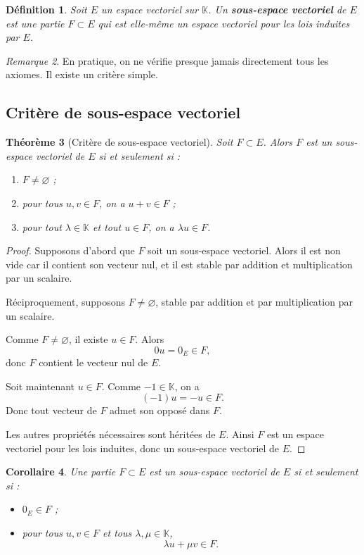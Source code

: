 \documentclass[11pt,a4paper]{article}
\newtheorem{definition}{Définition}[section]
\newtheorem{theoreme}[definition]{Théorème}
\newtheorem{corollaire}[definition]{Corollaire}
\theoremstyle{remark}
\newtheorem{remarque}[definition]{Remarque}
\newcommand{\K}{\mathbb{K}}
\begin{document}
\begin{definition}
Soit \(E\) un espace vectoriel sur \(\K\).  
Un \textbf{sous-espace vectoriel} de \(E\) est une partie \(F\subset E\) qui est elle-même un espace vectoriel pour les lois induites par \(E\).
\end{definition}

\begin{remarque}
En pratique, on ne vérifie presque jamais directement tous les axiomes. Il existe un critère simple.
\end{remarque}

\subsection{Critère de sous-espace vectoriel}

\begin{theoreme}[Critère de sous-espace vectoriel]
Soit \(F\subset E\). Alors \(F\) est un sous-espace vectoriel de \(E\) si et seulement si :
\begin{enumerate}
    \item \(F\neq \varnothing\) ;
    \item pour tous \(u,v\in F\), on a \(u+v\in F\) ;
    \item pour tout \(\lambda\in\K\) et tout \(u\in F\), on a \(\lambda u\in F\).
\end{enumerate}
\end{theoreme}

\begin{proof}
Supposons d’abord que \(F\) soit un sous-espace vectoriel. Alors il est non vide car il contient son vecteur nul, et il est stable par addition et multiplication par un scalaire.

Réciproquement, supposons \(F\neq\varnothing\), stable par addition et par multiplication par un scalaire.

Comme \(F\neq\varnothing\), il existe \(u\in F\). Alors
\[
0u=0_E\in F,
\]
donc \(F\) contient le vecteur nul de \(E\).

Soit maintenant \(u\in F\). Comme \(-1\in\K\), on a
\[
(-1)u=-u\in F.
\]
Donc tout vecteur de \(F\) admet son opposé dans \(F\).

Les autres propriétés nécessaires sont héritées de \(E\). Ainsi \(F\) est un espace vectoriel pour les lois induites, donc un sous-espace vectoriel de \(E\).
\end{proof}

\begin{corollaire}
Une partie \(F\subset E\) est un sous-espace vectoriel de \(E\) si et seulement si :
\begin{itemize}
    \item \(0_E\in F\) ;
    \item pour tous \(u,v\in F\) et tous \(\lambda,\mu\in\K\),
    \[
    \lambda u+\mu v\in F.
    \]
\end{itemize}
\end{corollaire}
\end{document}
